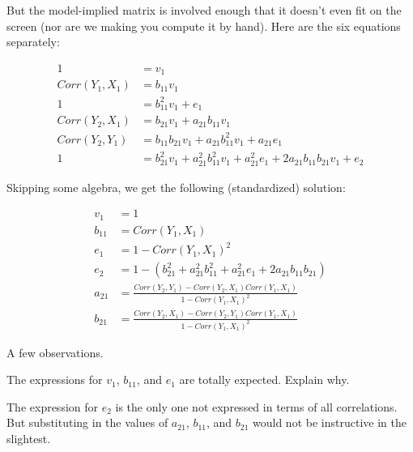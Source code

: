 \documentclass[
]{book}
\begin{document}
But the model-implied matrix is involved enough that it doesn't even fit on the screen (nor are we making you compute it by hand). Here are the six equations separately:

\begin{align}
1                   &= v_{1}                                \\
Corr(Y_{1}, X_{1})  &= b_{11}v_{1}                          \\
1                   &= b_{11}^{2}v_{1} + e_{1}              \\
Corr(Y_{2}, X_{1})  &= b_{21}v_{1} + a_{21}b_{11}v_{1}      \\
Corr(Y_{2}, Y_{1})  &= b_{11}b_{21}v_{1} +
                        a_{21}b_{11}^{2}v_{1} +
                        a_{21}e_{1}                         \\
1                   &= b_{21}^2v_{1} +
                        a_{21}^{2}b_{11}^{2}v_{1} +
                        a_{21}^{2}e_{1} +
                        2a_{21}b_{11}b_{21}v_{1} +
                        e_{2}
\end{align}

Skipping some algebra, we get the following (standardized) solution:

\begin{align}
v_{1}               &= 1                                \\
b_{11}              &= Corr(Y_{1}, X_{1})               \\
e_{1}               &= 1 - Corr(Y_{1}, X_{1})^{2}       \\
e_{2}               &= 1 - \left(b_{21}^2 +
                        a_{21}^{2}b_{11}^{2} +
                        a_{21}^{2}e_{1} +
                        2a_{21}b_{11}b_{21}\right)      \\
a_{21}  &= \frac{Corr(Y_{2}, Y_{1}) - 
                    Corr(Y_{2}, X_{1})Corr(Y_{1}, X_{1})}
                {1 - Corr(Y_{1}, X_{1})^{2}}                \\
b_{21}  &= \frac{Corr(Y_{2}, X_{1}) - 
                    Corr(Y_{2}, Y_{1})Corr(Y_{1}, X_{1})}
                {1 - Corr(Y_{1}, X_{1})^{2}}
\end{align}

A few observations.

The expressions for \(v_{1}\), \(b_{11}\), and \(e_{1}\) are totally expected. Explain why.

The expression for \(e_{2}\) is the only one not expressed in terms of all correlations. But substituting in the values of \(a_{21}\), \(b_{11}\), and \(b_{21}\) would not be instructive in the slightest.
\end{document}

